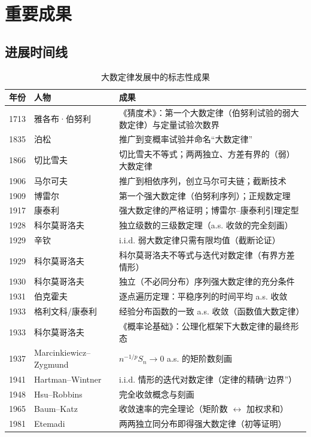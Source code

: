 \section{重要成果}\label{sec:results}

\subsection{进展时间线}

\begin{table}[htbp]
    \centering
    \caption{大数定律发展中的标志性成果}
    \label{tab:timeline}
    \begin{tabular}{llp{8.2cm}}
        \toprule
        年份 & 人物 & 成果 \\
        \midrule
        1713 & 雅各布·伯努利 & 《猜度术》：第一个大数定律（伯努利试验的弱大数定律）与定量试验次数界 \\
        1835 & 泊松 & 推广到变概率试验并命名“大数定律” \\
        1866 & 切比雪夫 & 切比雪夫不等式；两两独立、方差有界的（弱）大数定律 \\
        1906 & 马尔可夫 & 推广到相依序列，创立马尔可夫链；截断技术 \\
        1909 & 博雷尔 & 第一个强大数定律（伯努利序列）；正规数定理 \\
        1917 & 康泰利 & 强大数定律的严格证明；博雷尔--康泰利引理定型 \\
        1928 & 科尔莫哥洛夫 & 独立级数的三级数定理（a.s. 收敛的完全刻画） \\
        1929 & 辛钦 & i.i.d. 弱大数定律只需有限均值（截断论证） \\
        1929 & 科尔莫哥洛夫 & 科尔莫哥洛夫不等式与迭代对数定律（有界方差情形） \\
        1930 & 科尔莫哥洛夫 & 独立（不必同分布）序列强大数定律的充分条件 \\
        1931 & 伯克霍夫 & 逐点遍历定理：平稳序列的时间平均 a.s. 收敛 \\
        1933 & 格利文科/康泰利 & 经验分布函数的一致 a.s. 收敛（函数值大数定律） \\
        1933 & 科尔莫哥洛夫 & 《概率论基础》：公理化框架下大数定律的最终形态 \\
        1937 & Marcinkiewicz--Zygmund & $n^{-1/p} S_n \to 0$ a.s. 的矩阶数刻画 \\
        1941 & Hartman--Wintner & i.i.d. 情形的迭代对数定律（定律的精确“边界”） \\
        1948 & Hsu--Robbins & 完全收敛概念与刻画 \\
        1965 & Baum--Katz & 收敛速率的完全理论（矩阶数 $\leftrightarrow$ 加权求和） \\
        1981 & Etemadi & 两两独立同分布即得强大数定律（初等证明） \\
        \bottomrule
    \end{tabular}
\end{table}

